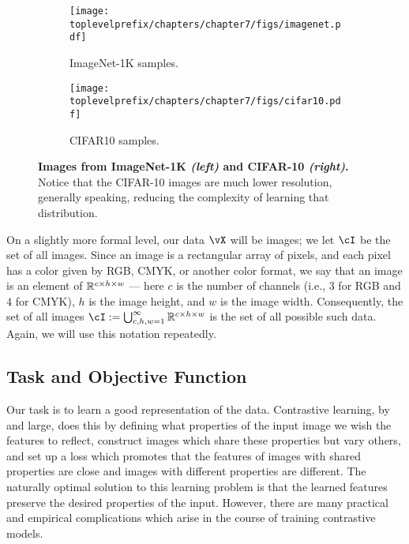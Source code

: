 \documentclass[../../book-main.tex]{subfiles}
\begin{document}
\begin{figure}
    \centering
    
    \hfill 
    \begin{subfigure}{0.3\textwidth}
        \centering 
        \texttt{[image: \\toplevelprefix/chapters/chapter7/figs/imagenet.pdf]}
        \caption{\small ImageNet-1K samples.}
    \end{subfigure}
    \hfill 
    \begin{subfigure}{0.26\textwidth}
        \centering 
        \texttt{[image: \\toplevelprefix/chapters/chapter7/figs/cifar10.pdf]}
        \caption{\small CIFAR10 samples.}
    \end{subfigure}
    \hfill 
    \phantom{}

    \caption{\small\textbf{Images from ImageNet-1K \textit{(left)} and CIFAR-10 \textit{(right)}.} Notice that the CIFAR-10 images are much lower resolution, generally speaking, reducing the complexity of learning that distribution.}
    \label{fig:in1k_cifar10_examples}
\end{figure}

On a slightly more formal level, our data \(\vX\) will be images; we let \(\cI\) be the set of all images. Since an image is a rectangular array of pixels, and each pixel has a color given by RGB, CMYK, or another color format, we say that an image is an element of \(\mathbb{R}^{c \times h \times w}\) --- here \(c\) is the number of channels (i.e., \(3\) for RGB and \(4\) for CMYK), \(h\) is the image height, and \(w\) is the image width. Consequently, the set of all images \(\cI := \bigcup_{c, h, w = 1}^{\infty}\R^{c \times h \times w}\) is the set of all possible such data. Again, we will use this notation repeatedly.


\subsection{Task and Objective Function} \label{sub:contrastive_learning_objective}

Our task is to learn a good representation of the data. Contrastive learning, by and large, does this by defining what properties of the input image we wish the features to reflect, construct images which share these properties but vary others, and set up a loss which promotes that the features of images with shared properties are close and images with different properties are different. The naturally optimal solution to this learning problem is that the learned features preserve the desired properties of the input. However, there are many practical and empirical complications which arise in the course of training contrastive models.
\end{document}
